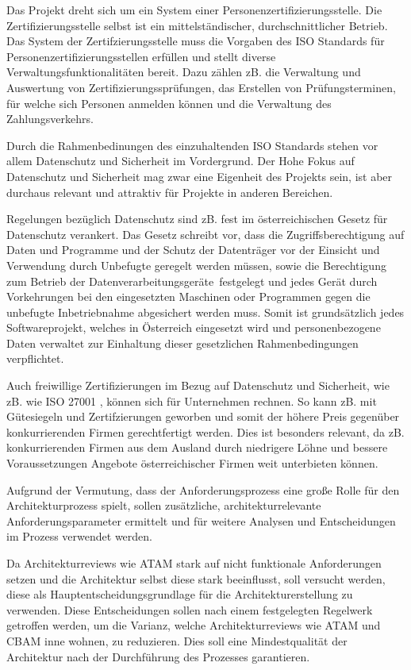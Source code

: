 Das Projekt dreht sich um ein System einer Personenzertifizierungsstelle. Die Zertifizierungsstelle selbst ist ein mittelständischer, durchschnittlicher Betrieb. Das System der Zertifzierungsstelle muss die Vorgaben des ISO Standards für Personenzertifizierungsstellen erfüllen\cite{ISO_CERT} und stellt diverse Verwaltungsfunktionalitäten bereit. Dazu zählen zB. die Verwaltung und Auswertung von Zertifizierungssprüfungen, das Erstellen von Prüfungsterminen, für welche sich Personen anmelden können und die Verwaltung des Zahlungsverkehrs.

Durch die Rahmenbedinungen des einzuhaltenden ISO Standards stehen vor allem Datenschutz und Sicherheit im Vordergrund. Der Hohe Fokus auf Datenschutz und Sicherheit mag zwar eine Eigenheit des Projekts sein, ist aber durchaus relevant und attraktiv für Projekte in anderen Bereichen.

Regelungen bezüglich Datenschutz sind zB. fest im österreichischen Gesetz für Datenschutz verankert. Das Gesetz schreibt vor, dass \glqq die Zugriffsberechtigung auf Daten und Programme und der Schutz der Datenträger vor der Einsicht und Verwendung durch Unbefugte\grqq \cite[§ 14, 5]{datenschutz} geregelt werden müssen, sowie \glqq die Berechtigung zum Betrieb der Datenverarbeitungsgeräte\grqq \ festgelegt \glqq und jedes Gerät durch Vorkehrungen bei den eingesetzten Maschinen oder Programmen gegen die unbefugte Inbetriebnahme\grqq \cite[§ 14, 6]{datenschutz} abgesichert werden muss. Somit ist grundsätzlich jedes Softwareprojekt, welches in Österreich eingesetzt wird und personenbezogene Daten verwaltet zur Einhaltung dieser gesetzlichen Rahmenbedingungen verpflichtet.

Auch freiwillige Zertifizierungen im Bezug auf Datenschutz und Sicherheit, wie zB. wie ISO 27001 \cite{ISO_SEC}, können sich für Unternehmen rechnen. So kann zB. mit Gütesiegeln und Zertifzierungen geworben und somit der höhere Preis gegenüber konkurrierenden Firmen gerechtfertigt werden. Dies ist besonders relevant, da zB. konkurrierenden Firmen aus dem Ausland durch niedrigere Löhne und bessere Voraussetzungen Angebote österreichischer Firmen weit unterbieten können.

Aufgrund der Vermutung, dass der Anforderungsprozess eine große Rolle für den Architekturprozess spielt, sollen zusätzliche, architekturrelevante Anforderungsparameter ermittelt und für weitere Analysen und Entscheidungen im Prozess verwendet werden.

Da Architekturreviews wie ATAM stark auf nicht funktionale Anforderungen setzen und die Architektur selbst diese stark beeinflusst, soll versucht werden, diese als Hauptentscheidungsgrundlage für die Architekturerstellung zu verwenden. Diese Entscheidungen sollen nach einem festgelegten Regelwerk getroffen werden, um die Varianz, welche Architekturreviews wie ATAM und CBAM inne wohnen, zu reduzieren. Dies soll eine Mindestqualität der Architektur nach der Durchführung des Prozesses garantieren.

